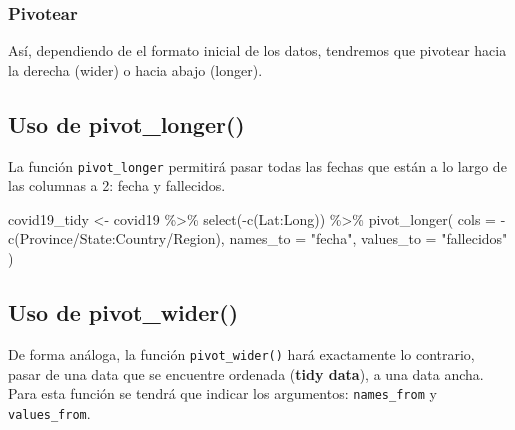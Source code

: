 \documentclass[
]{book}
\newenvironment{Shaded}{\begin{snugshade}}{\end{snugshade}}
\newcommand{\AttributeTok}[1]{\textcolor[rgb]{0.77,0.63,0.00}{#1}}
\newcommand{\FunctionTok}[1]{\textcolor[rgb]{0.00,0.00,0.00}{#1}}
\newcommand{\NormalTok}[1]{#1}
\newcommand{\OtherTok}[1]{\textcolor[rgb]{0.56,0.35,0.01}{#1}}
\newcommand{\SpecialCharTok}[1]{\textcolor[rgb]{0.00,0.00,0.00}{#1}}
\newcommand{\StringTok}[1]{\textcolor[rgb]{0.31,0.60,0.02}{#1}}
\begin{document}
\hypertarget{pivotear}{%
\subsubsection{Pivotear}\label{pivotear}}

Así, dependiendo de el formato inicial de los datos, tendremos que pivotear hacia la derecha (wider) o hacia abajo (longer).

\hypertarget{uso-de-pivot_longer}{%
\subsection{Uso de pivot\_longer()}\label{uso-de-pivot_longer}}

La función \texttt{pivot\_longer} permitirá pasar todas las fechas que están a lo largo de las columnas a 2: fecha y fallecidos.

\begin{Shaded}
\begin{Highlighting}[]
\NormalTok{covid19\_tidy }\OtherTok{\textless{}{-}}\NormalTok{ covid19 }\SpecialCharTok{\%\textgreater{}\%}
  \FunctionTok{select}\NormalTok{(}\SpecialCharTok{{-}}\FunctionTok{c}\NormalTok{(Lat}\SpecialCharTok{:}\NormalTok{Long)) }\SpecialCharTok{\%\textgreater{}\%}
  \FunctionTok{pivot\_longer}\NormalTok{(}
    \AttributeTok{cols =} \SpecialCharTok{{-}}\FunctionTok{c}\NormalTok{(}\StringTok{\textasciigrave{}}\AttributeTok{Province/State}\StringTok{\textasciigrave{}}\SpecialCharTok{:}\StringTok{\textasciigrave{}}\AttributeTok{Country/Region}\StringTok{\textasciigrave{}}\NormalTok{),}
    \AttributeTok{names\_to =} \StringTok{"fecha"}\NormalTok{,}
    \AttributeTok{values\_to =} \StringTok{"fallecidos"}
\NormalTok{  )}
\end{Highlighting}
\end{Shaded}

\hypertarget{uso-de-pivot_wider}{%
\subsection{Uso de pivot\_wider()}\label{uso-de-pivot_wider}}

De forma análoga, la función \texttt{pivot\_wider()} hará exactamente lo contrario, pasar de una data que se encuentre ordenada (\textbf{tidy data}), a una data ancha. Para esta función se tendrá que indicar los argumentos: \texttt{names\_from} y \texttt{values\_from}.
\end{document}
